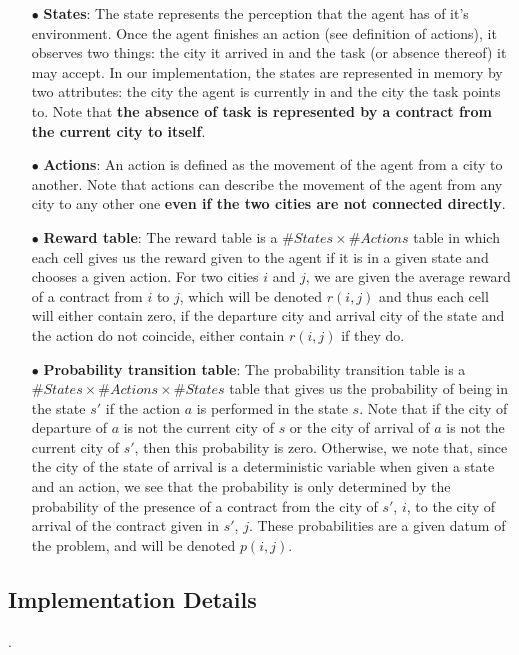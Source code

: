 \documentclass[11pt]{article}
\begin{document}
 	\begin{itemize}
 		 \item[$\bullet$] \textbf{States}: The state represents the perception that the agent has of it's environment. Once the agent finishes an action (see definition of actions), it observes two things: the city it arrived in and the task (or absence thereof) it may accept. In our implementation, the states are represented in memory by two attributes: the city the agent is currently in and the city the task points to. Note that \textbf{the absence of task is represented by a contract from the current city to itself}.
 		 
 		 \item[$\bullet$] \textbf{Actions}: An action is defined as the movement of the agent from a city to another. Note that actions can describe the movement of the agent from any city to any other one \textbf{even if the two cities are not connected directly}.
 		 
 		 \item[$\bullet$] \textbf{Reward table}: The reward table is a $\# States\times\# Actions$ table in which each cell gives us the reward given to the agent if it is in a given state and chooses a given action. For two cities $i$ and $j$, we are given the average reward of a contract from $i$ to $j$, which will be denoted $r(i,j)$ and thus each cell will either contain zero, if the departure city and arrival city of the state and the action do not coincide, either contain $r(i,j)$ if they do.
 		 
 		 \item[$\bullet$] \textbf{Probability transition table}: The probability transition table is a $\# States\times\# Actions\times\# States$ table that gives us the probability of being in the state $s'$ if the action $a$ is performed in the state $s$. Note that if the city of departure of $a$ is not the current city of $s$ or the city of arrival of $a$ is not the current city of $s'$, then this probability is zero. Otherwise, we note that, since the city of the state of arrival is a deterministic variable when given a state and an action, we see that the probability is only determined by the probability of the presence of a contract from the city of $s'$, $i$, to the city of arrival of the contract given in $s'$, $j$. These probabilities are a given datum of the problem, and will be denoted $p(i,j)$.
	\end{itemize}
 		 
\subsection{Implementation Details}.
\end{document}
